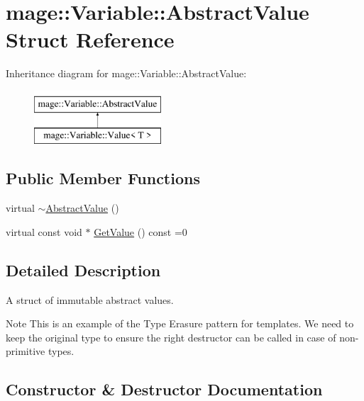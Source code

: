 \hypertarget{structmage_1_1_variable_1_1_abstract_value}{}\section{mage\+:\+:Variable\+:\+:Abstract\+Value Struct Reference}
\label{structmage_1_1_variable_1_1_abstract_value}
Inheritance diagram for mage\+:\+:Variable\+:\+:Abstract\+Value\+:\begin{figure}[H]
\begin{center}
\leavevmode
\includegraphics[height=2.000000cm]{structmage_1_1_variable_1_1_abstract_value}
\end{center}
\end{figure}
\subsection*{Public Member Functions}
\begin{DoxyCompactItemize}
\item 
virtual \hyperlink{structmage_1_1_variable_1_1_abstract_value_ae3334a01bd2e0a2ea6bd8d3530cf60eb}{$\sim$\+Abstract\+Value} ()
\item 
virtual const void $\ast$ \hyperlink{structmage_1_1_variable_1_1_abstract_value_aede2a77b571b80794a4254e34144f4c1}{Get\+Value} () const =0
\end{DoxyCompactItemize}


\subsection{Detailed Description}
A struct of immutable abstract values.

\begin{DoxyNote}{Note}
This is an example of the Type Erasure pattern for templates. We need to keep the original type to ensure the right destructor can be called in case of non-\/primitive types. 
\end{DoxyNote}


\subsection{Constructor \& Destructor Documentation}
\hypertarget{structmage_1_1_variable_1_1_abstract_value_ae3334a01bd2e0a2ea6bd8d3530cf60eb}{}\label{structmage_1_1_variable_1_1_abstract_value_ae3334a01bd2e0a2ea6bd8d3530cf60eb} 
